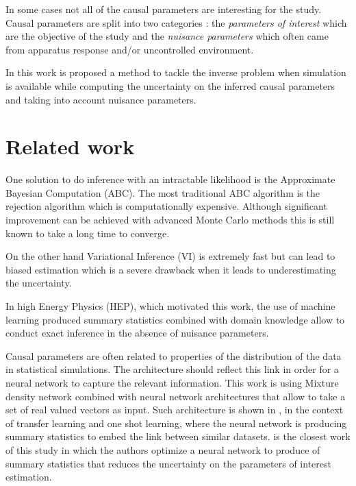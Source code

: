 In some cases not all of the causal parameters are interesting for the study.
Causal parameters are split into two categories : the \emph{parameters of interest} which are the objective of the study and the \emph{nuisance parameters} which often came from apparatus response and/or uncontrolled environment.

In this work is proposed a method to tackle the inverse problem when simulation is available while computing the uncertainty on the inferred causal parameters and taking into account nuisance parameters.


\section{Related work}





One solution to do inference with an intractable likelihood is the Approximate Bayesian Computation (ABC).
The most traditional ABC algorithm is the rejection algorithm which is computationally expensive.
Although significant improvement can be achieved with advanced Monte Carlo methods this is still known to take a long time to converge.

On the other hand Variational Inference (VI) is extremely fast but can lead to biased estimation which is a severe drawback when it leads to underestimating the uncertainty.

In high Energy Physics (HEP), which motivated this work, the use of machine learning produced summary statistics combined with domain knowledge allow to conduct exact inference in the absence of nuisance parameters.


Causal parameters are often related to properties of the distribution of the data in statistical simulations.
The architecture should reflect this link in order for a neural network to capture the relevant information.
This work is using Mixture density network \cite{Bishop94mixturedensity} combined with neural network architectures that allow to take a set of real valued vectors as input.
Such architecture is shown in \cite{Edwards17neuralstatistician}, in the context of transfer learning and one shot learning, where the neural network is producing summary statistics to embed the link between similar datasets.
\cite{DECASTRO2019170inferno} is the closest work of this study in which the authors optimize a neural network to produce of summary statistics that reduces the uncertainty on the parameters of interest estimation.


